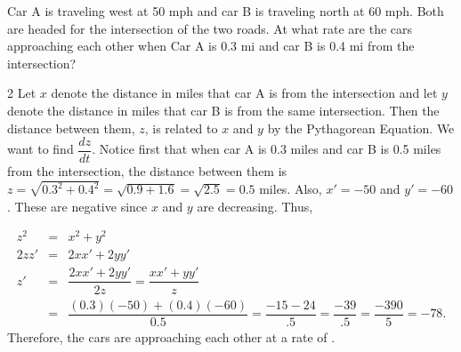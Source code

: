 \documentclass{book}
\begin{document}
\begin{Exam} Car A is traveling west at 50 mph and car B is traveling north at 60 mph. Both are headed for the intersection of the two roads. At what rate are the cars approaching each other when Car A is 0.3 mi and car B is 0.4 mi from the intersection?
\begin{multicols}{2}
Let $x$ denote the distance in miles that car A is from the intersection and let $y$ denote the distance in miles that car B is from the same intersection.  Then the distance between them, $z$, is related to $x$ and $y$ by the Pythagorean Equation. We want to find $\dfrac{dz}{dt}$. Notice first that when car A is 0.3 miles and car B is 0.5 miles from the intersection, the distance between them is $z = \sqrt{0.3^2 + 0.4^2} = \sqrt{0.9 +1.6} = \sqrt{2.5} = 0.5$ miles. Also, $x' = -50$ and $y'  =- 60$. These are negative since $x$ and $y$ are decreasing. Thus, 
\columnbreak

\begin{center}
\end{center}
\end{multicols}
\begin{eqnarray*} 
z^2 &=& x^2 + y^2\\
2zz' &=& 2xx' + 2yy'\\
z' &=& \dfrac{2xx' + 2yy'}{2z} = \dfrac{xx'+yy'}{z}\\
&=& \dfrac{(0.3)(-50) + (0.4)(-60)}{0.5} = \dfrac{-15 - 24}{.5} = \dfrac{-39}{.5} = \dfrac{-390}{5} = -78.
\end{eqnarray*} Therefore, the cars are approaching each other at a rate of . 
\end{Exam}

\vfill
{}
\pagebreak
\end{document}
